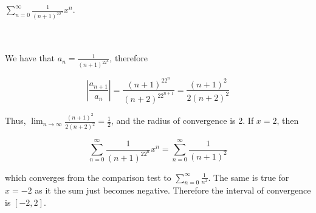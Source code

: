 $\sum_{n=0}^{\infty}\frac{1}{(n+1)^22^n}x^n$.\\\\

\begin{solution}\renewcommand{\qedsymbol}{}\ \\
    We have that $a_n=\frac{1}{(n+1)^22^n}$, therefore
    
    $$|\frac{a_{n+1}}{a_n}|=\frac{(n+1)^22^n}{(n+2)^22^{n+1}}=\frac{(n+1)^2}{2(n+2)^2}$$
    
    Thus, $\lim_{n\to\infty} \frac{(n+1)^2}{2(n+2)^2}=\frac12$, and the radius of convergence is 2. If
    $x=2$, then
    
    $$\sum_{n=0}^{\infty}\frac{1}{(n+1)^22^n}x^n=\sum_{n=0}^{\infty}\frac{1}{(n+1)^2}$$
    
    which converges from the comparison test to $\sum_{n=0}^{\infty}\frac{1}{n^2}$. The same is true for
    $x=-2$ as it the sum just becomes negative. Therefore the interval of convergence is $[-2,2]$.

\end{solution}